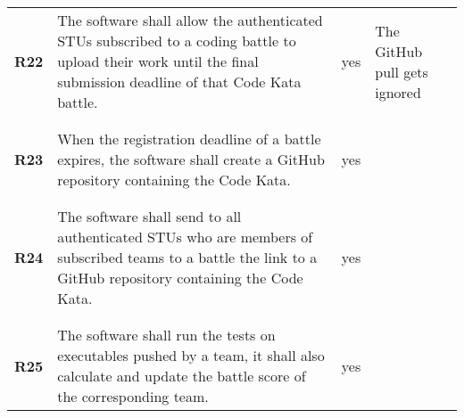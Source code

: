 \begin{longtable}[H]{l p{6.5cm} l p{3cm}}
    \textbf{R22} & The software shall allow the authenticated STUs subscribed to a coding battle to upload their work until the final submission deadline of that Code Kata battle.                                                      & {\color{green}yes}   & The GitHub pull gets ignored                                                            \\
                 &                                                                                                                                                                                                                       &                      &                                                                                         \\\hline & & & \\
    \textbf{R23} & When the registration deadline of a battle expires, the software shall create a GitHub repository containing the Code Kata.                                                                                           & {\color{green}yes}   &                                                                                         \\
                 &                                                                                                                                                                                                                       &                      &                                                                                         \\\hline & & & \\
    \textbf{R24} & The software shall send to all authenticated STUs who are members of subscribed teams to a battle the link to a GitHub repository containing the Code Kata.                                                           & {\color{green}yes}   &                                                                                         \\
                 &                                                                                                                                                                                                                       &                      &                                                                                         \\\hline & & & \\
    \textbf{R25} & The software shall run the tests on executables pushed by a team, it shall also calculate and update the battle score of the corresponding team.                                                                      & {\color{green}yes}   &                                                                                         \\

\end{longtable}
